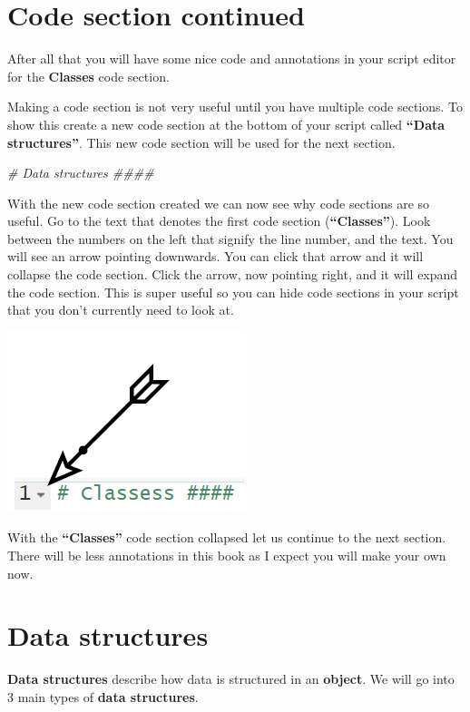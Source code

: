 \documentclass[]{book}
\newenvironment{Shaded}{\begin{snugshade}}{\end{snugshade}}
\newcommand{\CommentTok}[1]{\textcolor[rgb]{0.56,0.35,0.01}{\textit{#1}}}
\begin{document}
\section{Code section continued}\label{code-section-continued}

After all that you will have some nice code and annotations in your
script editor for the \textbf{Classes} code section.

Making a code section is not very useful until you have multiple code
sections. To show this create a new code section at the bottom of your
script called \textbf{``Data structures''}. This new code section will
be used for the next section.

\begin{Shaded}
\begin{Highlighting}[]
\CommentTok{# Data structures ####}
\end{Highlighting}
\end{Shaded}

With the new code section created we can now see why code sections are
so useful. Go to the text that denotes the first code section
(\textbf{``Classes''}). Look between the numbers on the left that
signify the line number, and the text. You will see an arrow pointing
downwards. You can click that arrow and it will collapse the code
section. Click the arrow, now pointing right, and it will expand the
code section. This is super useful so you can hide code sections in your
script that you don't currently need to look at.

\begin{center}\includegraphics[width=0.2\linewidth]{figures/R_code_section_collapse} \end{center}

With the \textbf{``Classes''} code section collapsed let us continue to
the next section. There will be less annotations in this book as I
expect you will make your own now.

\section{Data structures}\label{data-structures}

\textbf{Data structures} describe how data is structured in an
\textbf{object}. We will go into 3 main types of \textbf{data
structures}.
\end{document}
